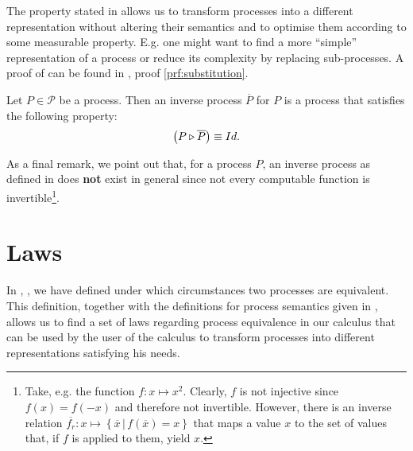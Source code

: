 The property stated in  allows us to transform processes into a different representation without altering their semantics and to optimise them according to some measurable property. E.g. one might want to find a more \enquote{simple} representation of a process or reduce its complexity by replacing sub-processes. A proof of  can be found in , proof \ref{prf:substitution}.

\begin{definition}
\label{def:inverse_process}
Let $P \in \mathcal{P}$ be a process. Then an inverse process $\overline{P}$ for $P$ is a process that satisfies the following property:
  \begin{equation*}
    \left( P \triangleright \overline{P} \right) \equiv Id.
  \end{equation*}
  \hfill\qedsymbol
\end{definition}



As a final remark, we point out that, for a process $P$, an inverse process as defined in  does \textbf{not} exist in general since not every computable function is invertible\footnote{Take, e.g. the function $f \colon x \mapsto x^2$. Clearly, $f$ is not injective since $f \left( x \right) = f \left( -x \right)$ and therefore not invertible. However, there is an inverse relation $\overline{f_r} \colon x \mapsto \left\{ \overline{x} \,|\, f \left( \overline{x} \right) = x \right\}$ that maps a value $x$ to the set of values that, if $f$ is applied to them, yield $x$.}.



\clearpage
\section{Laws}
\label{chp:laws}
In , , we have defined under which circumstances two processes are equivalent. This definition, together with the definitions for process semantics given in , allows us to find a set of laws regarding process equivalence in our calculus that can be used by the user of the calculus to transform processes into different representations satisfying his needs.

